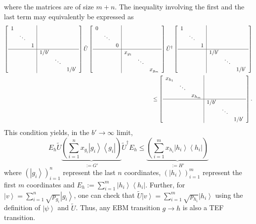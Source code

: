 \documentclass{article}
\begin{document}
where the matrices are of size $m+n$. The inequality involving the
first and the last term may equivalently be expressed as 
\begin{align}
\left[\begin{array}{ccc|ccc}
1 &  & \\
 & \ddots & \\
 &  & 1\\
\hline  &  &  & 1/b'\\
 &  &  &  & \ddots\\
 &  &  &  &  & 1/b'
\end{array}\right]\tilde{U}\left[\begin{array}{ccc|ccc}
0 &  & \\
 & \ddots & \\
 &  & 0\\
\hline  &  &  & x_{g_{1}}\\
 &  &  &  & \ddots\\
 &  &  &  &  & x_{g_{m}}
\end{array}\right]\tilde{U}^{\dagger}\left[\begin{array}{ccc|ccc}
1 &  & \\
 & \ddots & \\
 &  & 1\\
\hline  &  &  & 1/b'\\
 &  &  &  & \ddots\\
 &  &  &  &  & 1/b'
\end{array}\right]\nonumber \\
\le\left[\begin{array}{ccc|ccc}
x_{h_{1}} &  & \\
 & \ddots & \\
 &  & x_{h_{m}}\\
\hline  &  &  & 1/b'\\
 &  &  &  & \ddots\\
 &  &  &  &  & 1/b'
\end{array}\right].\label{eq:noDivergence}
\end{align}
This condition yields, in the $b'\to\infty$ limit, 
\begin{equation}
E_{h}\tilde{U}\underbrace{\left(\sum_{i=1}^{n}x_{g_{i}}\left|g_{i}\right\rangle \left\langle g_{i}\right|\right)}_{:=G'}\tilde{U}^{\dagger}E_{h}\le\underbrace{\left(\sum_{i=1}^{m}x_{h_{i}}\left|h_{i}\right\rangle \left\langle h_{i}\right|\right)}_{:=H'}\label{eq:TEFcondition_noDivergence}
\end{equation}
where $(\left|g_{i}\right\rangle )_{i=1}^{n}$ represent the last
$n$ coordinates, $(\left|h_{i}\right\rangle )_{i=1}^{m}$ represent
the first $m$ coordinates and $E_{h}:=\sum_{i=1}^{m}\left|h_{i}\right\rangle \left\langle h_{i}\right|$.
Further, for $\left|v\right\rangle =\sum_{i=1}^{n}\sqrt{p_{g_{i}}}\left|g_{i}\right\rangle $,
one can check that $\tilde{U}\left|v\right\rangle =\sum_{i=1}^{m}\sqrt{p_{h_{i}}}\left|h_{i}\right\rangle $
using the definition of $\left|\psi\right\rangle $ and $\tilde{U}$.
Thus, any EBM transition $g\to h$ is also a TEF transition. 
\end{document}
